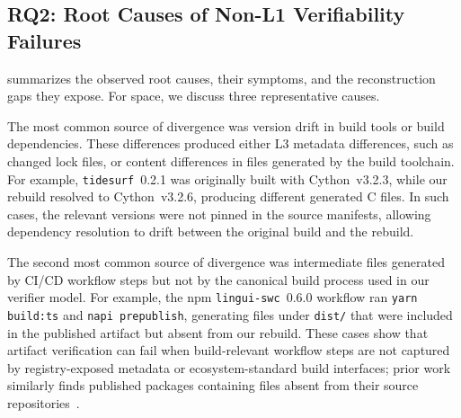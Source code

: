 
\subsection{RQ2: Root Causes of Non-L1 Verifiability Failures}
\label{subsec:results-rq2}



 summarizes the observed root causes, their symptoms, and the reconstruction gaps they expose. For space, we discuss three representative causes.

The most common source of divergence was version drift in build tools or build dependencies. 
These differences produced either L3 metadata differences, such as changed lock files, or content differences in files generated by the build toolchain. 
For example, \texttt{tidesurf}~0.2.1 was originally built with Cython~v3.2.3, while our rebuild resolved to Cython~v3.2.6, producing different generated C files.
In such cases, the relevant versions were not pinned in the source manifests, allowing dependency resolution to drift between the original build and the rebuild.

The second most common source of divergence was intermediate files generated by CI/CD workflow steps but not by the canonical build process used in our verifier model. For example, the npm \texttt{lingui-swc}~0.6.0 workflow ran \texttt{yarn build:ts} and \texttt{napi prepublish}, generating files under \texttt{dist/} that were included in the published artifact but absent from our rebuild.
These cases show that artifact verification can fail when build-relevant workflow steps are not captured by registry-exposed metadata or ecosystem-standard build interfaces; prior work similarly finds published packages containing files absent from their source repositories~\cite{vu_lastpymile_2021}.


